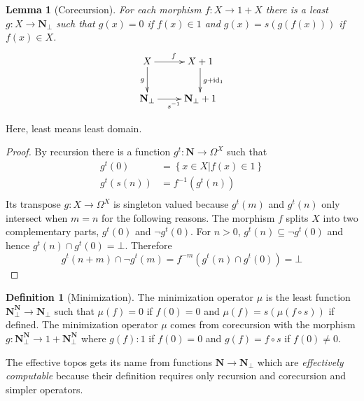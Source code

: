 \documentclass{amsart}
\theoremstyle{plain}
\newtheorem{lemma}[theorem]{Lemma}
\theoremstyle{definition}
\newtheorem{defin}[theorem]{Definition}
\newcommand\set[1]{\left\{#1\right\}}
\newcommand\id{\mathrm{id}}
\newcommand\N{\mathbf N}
\begin{document}
\begin{lemma}[Corecursion] For each morphism $f:X\to 1+X$ there is a least $g:X\to \N_\bot$ such that $g(x)=0$ if $f(x)\in 1$ and $g(x) = s(g(f(x)))$ if $f(x)\in X$. 
\[ \xymatrix{
X \ar[r]^f\ar[d]_g & X+1 \ar[d]^{g+\id_1}\\
\N_\bot \ar[r]_{s^{-1}} & \N_\bot+1 
}\]
\end{lemma}

Here, least means least domain.

\begin{proof} By recursion there is a function $g^t:\N \to \Omega^X$ such that
\begin{align*} 
g^t(0) &= \set{x\in X|f(x)\in 1} \\
g^t(s(n)) &= f^{-1}(g^t(n))\\
\end{align*}
Its transpose $g:X\to \Omega^X$ is singleton valued because $g^t(m)$ and $g^t(n)$ only intersect when $m=n$ for the following reasons. The morphism $f$ splits $X$ into two complementary parts, $g^t(0)$ and $\neg g^t(0)$. For $n>0$, $g^t(n)\subseteq \neg g^t(0)$ and hence $g^t(n)\cap g^t(0) = \bot$. Therefore 
\[ g^t(n+m)\cap \neg g^t(m) = f^{-m}(g^t(n)\cap g^t(0)) = \bot \]
\end{proof}

\begin{defin}[Minimization] The minimization operator $\mu$ is the least function $\N_\bot^\N \to \N_\bot$ such that $\mu(f) = 0$ if $f(0) = 0$ and $\mu(f) = s(\mu(f\circ s))$ if defined. 
The minimization operator $\mu$ comes from corecursion with the morphism $g:\N_\bot^\N \to 1+\N_\bot^\N$ where $g(f):1$ if $f(0)=0$ and $g(f) = f\circ s$ if $f(0)\neq 0$.
\end{defin}

The effective topos gets its name from functions $\N\to\N_\bot$ which are \emph{effectively computable} because their definition requires only recursion and corecursion and simpler operators.
\end{document}

